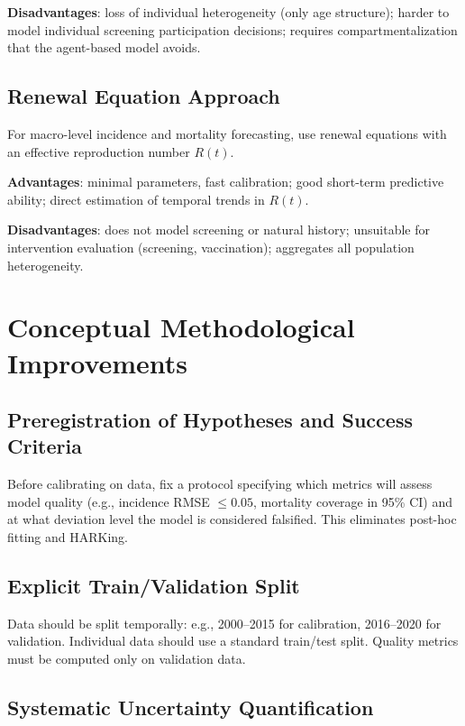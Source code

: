 \documentclass[12pt,a4paper]{article}
\begin{document}
\textbf{Disadvantages}: loss of individual heterogeneity (only age structure); harder to model individual screening participation decisions; requires compartmentalization that the agent-based model avoids.

\subsection{Renewal Equation Approach}

For macro-level incidence and mortality forecasting, use renewal equations with an effective reproduction number $R(t)$.

\textbf{Advantages}: minimal parameters, fast calibration; good short-term predictive ability; direct estimation of temporal trends in $R(t)$.

\textbf{Disadvantages}: does not model screening or natural history; unsuitable for intervention evaluation (screening, vaccination); aggregates all population heterogeneity.

\section{Conceptual Methodological Improvements}

\subsection{Preregistration of Hypotheses and Success Criteria}

Before calibrating on data, fix a protocol specifying which metrics will assess model quality (e.g., incidence RMSE $\le 0.05$, mortality coverage in 95\% CI) and at what deviation level the model is considered falsified. This eliminates post-hoc fitting and HARKing.

\subsection{Explicit Train/Validation Split}

Data should be split temporally: e.g., 2000--2015 for calibration, 2016--2020 for validation. Individual data should use a standard train/test split. Quality metrics must be computed only on validation data.

\subsection{Systematic Uncertainty Quantification}
\end{document}
